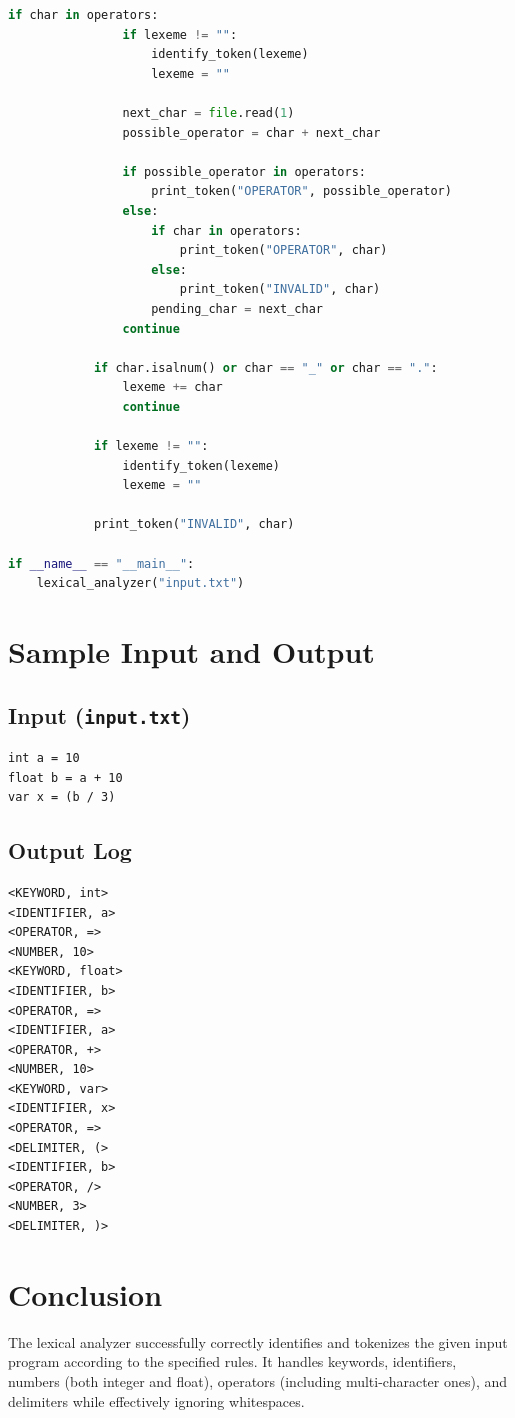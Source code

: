 \documentclass{article}
\begin{document}
\begin{lstlisting}[language=Python, caption=Lexical Analyzer Source Code]
            if char in operators:
                if lexeme != "":
                    identify_token(lexeme)
                    lexeme = ""

                next_char = file.read(1)
                possible_operator = char + next_char

                if possible_operator in operators:
                    print_token("OPERATOR", possible_operator)
                else:
                    if char in operators:
                        print_token("OPERATOR", char)
                    else:
                        print_token("INVALID", char)
                    pending_char = next_char
                continue

            if char.isalnum() or char == "_" or char == ".":
                lexeme += char
                continue

            if lexeme != "":
                identify_token(lexeme)
                lexeme = ""

            print_token("INVALID", char)

if __name__ == "__main__":
    lexical_analyzer("input.txt")
\end{lstlisting}

\section{Sample Input and Output}

\subsection{Input (\texttt{input.txt})}
\begin{lstlisting}
int a = 10
float b = a + 10
var x = (b / 3)
\end{lstlisting}

\subsection{Output Log}
\begin{lstlisting}
<KEYWORD, int>
<IDENTIFIER, a>
<OPERATOR, =>
<NUMBER, 10>
<KEYWORD, float>
<IDENTIFIER, b>
<OPERATOR, =>
<IDENTIFIER, a>
<OPERATOR, +>
<NUMBER, 10>
<KEYWORD, var>
<IDENTIFIER, x>
<OPERATOR, =>
<DELIMITER, (>
<IDENTIFIER, b>
<OPERATOR, />
<NUMBER, 3>
<DELIMITER, )>
\end{lstlisting}

\section{Conclusion}
The lexical analyzer successfully correctly identifies and tokenizes the given input program according to the specified rules. It handles keywords, identifiers, numbers (both integer and float), operators (including multi-character ones), and delimiters while effectively ignoring whitespaces.
\end{document}
